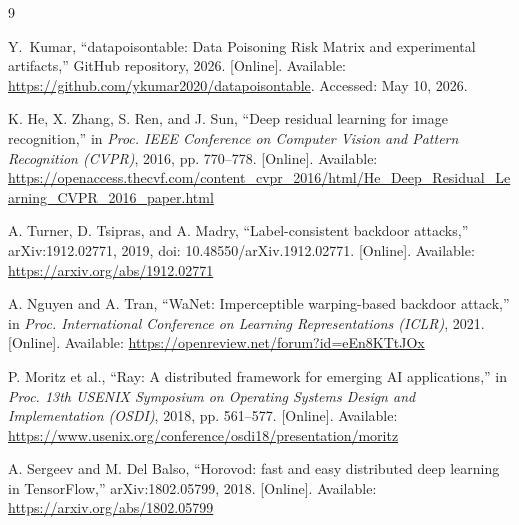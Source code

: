 \documentclass[conference]{IEEEtran}
\begin{document}
\begin{thebibliography}{9}

Y.~Kumar, ``datapoisontable: Data Poisoning Risk Matrix and experimental artifacts,'' GitHub repository, 2026. [Online]. Available: \url{https://github.com/ykumar2020/datapoisontable}. Accessed: May 10, 2026.

K. He, X. Zhang, S. Ren, and J. Sun, ``Deep residual learning for image recognition,'' in \emph{Proc. IEEE Conference on Computer Vision and Pattern Recognition (CVPR)}, 2016, pp. 770--778. [Online]. Available: \url{https://openaccess.thecvf.com/content_cvpr_2016/html/He_Deep_Residual_Learning_CVPR_2016_paper.html}

A. Turner, D. Tsipras, and A. Madry, ``Label-consistent backdoor attacks,'' arXiv:1912.02771, 2019, doi: 10.48550/arXiv.1912.02771. [Online]. Available: \url{https://arxiv.org/abs/1912.02771}

A. Nguyen and A. Tran, ``WaNet: Imperceptible warping-based backdoor attack,'' in \emph{Proc. International Conference on Learning Representations (ICLR)}, 2021. [Online]. Available: \url{https://openreview.net/forum?id=eEn8KTtJOx}

P. Moritz et al., ``Ray: A distributed framework for emerging AI applications,'' in \emph{Proc. 13th USENIX Symposium on Operating Systems Design and Implementation (OSDI)}, 2018, pp. 561--577. [Online]. Available: \url{https://www.usenix.org/conference/osdi18/presentation/moritz}

A. Sergeev and M. Del Balso, ``Horovod: fast and easy distributed deep learning in TensorFlow,'' arXiv:1802.05799, 2018. [Online]. Available: \url{https://arxiv.org/abs/1802.05799}

\end{thebibliography}
\end{document}
